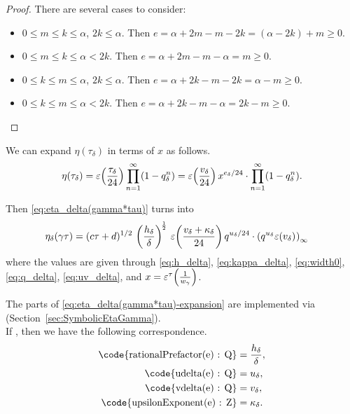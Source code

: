 \documentclass{article}
\begin{document}
\begin{Hemmecke}
\begin{proof}
There are several cases to consider:
\begin{itemize}
\item $0\le m\le k \le \alpha$, $2k \le \alpha$. Then
  $e=\alpha+2m-m-2k=(\alpha-2k)+m\ge0$.
\item $0\le m\le k \le \alpha < 2k$. Then
  $e=\alpha+2m-m-\alpha=m\ge0$.

\item $0\le k\le m \le \alpha$, $2k \le \alpha$. Then
  $e=\alpha+2k-m-2k=\alpha-m\ge0$.
\item $0\le k\le m \le \alpha < 2k$. Then
  $e=\alpha+2k-m-\alpha=2k-m\ge0$.
\end{itemize}
\end{proof}

We can expand $\eta(\tau_\delta)$ in terms of $x$ as follows.
\begin{gather*}
  \eta(\tau_\delta)
  =
    \varepsilon\!\left({\frac{\tau_\delta}{24}}\right)
    \prod_{n=1}^{\infty}(1-q_\delta^n)
  =
  \varepsilon\!\left(\frac{v_\delta}{24}\right) x^{e_\delta/24}
  \cdot
  \prod_{n=1}^{\infty}(1-q_\delta^n).
\end{gather*}

Then \eqref{eq:eta_delta(gamma*tau)} turns into
\begin{align}
\eta_\delta(\gamma\tau)
&=
(c \tau+d)^{1/2}
\,
\left(\frac{h_\delta}{\delta}\right)^{\!\frac{1}{2}}
\,
  \unityPower{\frac{v_\delta + \kappa_\delta}{24}}
  q^{u_\delta/24} \cdot \eulerFunction[q^{u_\delta} \unityPower{v_\delta}]{}
\label{eq:eta_delta(gamma*tau)-expansion}
\end{align}
where the values are given through \eqref{eq:h_delta},
\eqref{eq:kappa_delta}, \eqref{eq:width0}, \eqref{eq:q_delta},
\eqref{eq:uv_delta}, and $x=\varepsilon^\tau\!\left(\frac{1}{w_\gamma}\right)$.



The parts of \eqref{eq:eta_delta(gamma*tau)-expansion} are implemented
via \textcolor{blue}{}
(Section~\ref{sec:SymbolicEtaGamma}).
\\
If , then we have the following
correspondence.
\begin{align*}
\text{\code{rationalPrefactor(e) : Q}} &= \frac{h_\delta}{\delta},\\
\text{\code{udelta(e) : Q}}            &= u_\delta,\\
\text{\code{vdelta(e) : Q}}            &= v_\delta,\\
\text{\code{upsilonExponent(e) : Z}}   &= \kappa_\delta.
\end{align*}



\end{Hemmecke}
\end{document}
